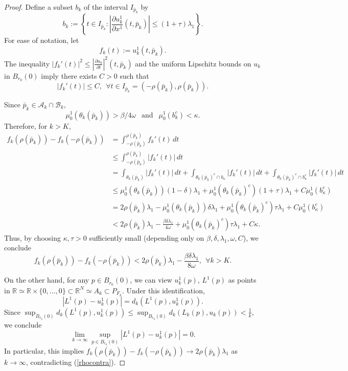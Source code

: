 \documentclass[12pt]{amsart}
\theoremstyle{definition}
\numberwithin{equation}{section}
\newcommand{\R}{\mathbb R}
\newcommand{\PFk}{P_{F_k}}
\begin{document}
\begin{proof}
Define a subset $b_k$ of the interval $I_{\bar p_{k}}$ by
\[
 b_k:=\left \{t \in I_{\bar p_k}: \left| \frac{\partial u^1_k}{\partial x^1} (t, \bar p_k) \right| \leq (1+\tau) \lambda_1 \right\}.
\]
For ease of notation, let $$
f_k(t):= u_k^1(t, \bar p_k).
$$
 The inequality $|f_k'(t)|^2 \leq \left|\frac{\partial u_k}{\partial  t}\right|^2(t, \bar p_k)$ and the uniform Lipschitz bounds on $u_k$ in $B_{r_0}(0)$ imply there exists $C>0$ such that 
 $$
 |f_k'(t)| \leq C, \ \ \forall t \in I_{\bar p_k}=(-\rho(\bar p_k), \rho(\bar p_k)).$$


Since $\bar p_k \in \mathcal A_k \cap  \mathcal B_k$,
\[
\mu_0^1(\theta_k(\bar p_k)) > \beta/4\omega \ \ \mbox{ and } \ \ 
\mu_0^1(b_k^c)<\kappa.
\]
Therefore, for $k >K$,
\begin{align*}
f_k(\rho(\bar p_k))- f_k(-\rho(\bar p_k))&=
 \int_{-\rho(\bar p_k)} ^{\rho(\bar p_k)}f_k'(t)\, dt
  \nonumber \\
& \leq \int_{-\rho(\bar p_k)} ^{\rho(\bar p_k)}|f_k'(t)|\, dt \nonumber \\
&=\int_{\theta_k(\bar p_k)} |f_k'(t)|\, dt+\int_{\theta_k(\bar p_k)^c \cap b_\kappa} |f_k'(t)|\, dt+\int_{\theta_k(\bar p_k)^c \cap b_\kappa^c} |f_k'(t)|\, dt 
\nonumber \\
& \leq\mu_0^1(\theta_k(\bar p_k))(1-\delta)\lambda_1+ \mu_0^1(\theta_k(\bar p_k)^c) (1+\tau) \lambda_1+ C \mu_0^1(b_\kappa^c)\nonumber \\
& =   2 \rho(\bar p_k)  \lambda_1
-\mu_0^1(\theta_k(\bar p_k))\delta \lambda_1+ \mu_0^1(\theta_k(\bar p_k)^c) \tau \lambda_1+ C \mu_0^1(b_\kappa^c) \nonumber
\\
&< 2 \rho(\bar p_k)  \lambda_1
-\frac{\beta \delta \lambda_1}{4\omega}+ \mu_0^1(\theta_k(\bar p_k)^c) \tau \lambda_1+ C \kappa. \nonumber
\end{align*}
Thus, by choosing $\kappa, \tau>0$ sufficiently small (depending only on $\beta, \delta, \lambda_1, \omega, C$), we conclude
\begin{equation} \label{rhocontra}
f_k(\rho(\bar p_k))- f_k(-\rho(\bar p_k)) <  2 \rho(\bar p_k)  \lambda_1
-\frac{\beta \delta \lambda_1}{8\omega}, \ \ \forall k >K.
\end{equation}

On the other hand, for any $p \in B_{r_0}(0)$, we can view $u_k^1(p)$, $L^1(p)$ as points in $\R \simeq  \R \times \{0,\dots, 0\} \subset \R^N \simeq A_k \subset \PFk$.  Under this identification,
\[
|L^1(p)- u_k^1(p)| = d_k(L^1(p),  u_k^1(p)).
\]
Since $\sup_{B_{r_0}(0)} d_k(L^1(p),u_k^1(p)) 
   \leq 
   \sup_{B_{r_0}(0)} d_k(L_k(p), u_k(p)) < \frac{1}{k}$,
   we conclude
\[
\lim_{k \rightarrow \infty}  \sup_{p \in B_{r_0}(0)}|L^1(p)- u_k^1(p)| = 0.
\]
In particular, this implies $f_k(\rho(\bar p_k))- f_k(-\rho(\bar p_k)) \to 2 \rho(\bar p_k)\lambda_1$ as $k \rightarrow \infty$, contradicting (\ref{rhocontra}).
\end{proof}
\end{document}
